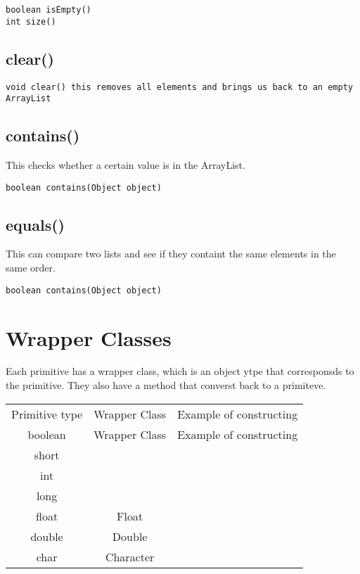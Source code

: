 \documentclass[a4paper]{report}   %
\begin{document}
\begin{lstlisting}
boolean isEmpty()
int size()
\end{lstlisting}

\subsection{clear()}

\begin{lstlisting}
void clear() this removes all elements and brings us back to an empty ArrayList
\end{lstlisting}

\subsection{contains()}

This checks whether a certain value is in the ArrayList.

\begin{lstlisting}
boolean contains(Object object)
\end{lstlisting}

\subsection{equals()}

This can compare two lists and see if they containt the same elements in the same order.

\begin{lstlisting}
boolean contains(Object object)
\end{lstlisting}

\section{Wrapper Classes}

Each primitive has a wrapper class, which is an object ytpe that corresponsds to the primitive. They also have a method that converst back to a primiteve.\\


\begin{center}
\begin{tabular}{| c | c | c |}
Primitive type & Wrapper Class & Example of constructing\\
boolean & Wrapper Class & Example of constructing\\
short\\
int\\
long\\
float & Float\\
double & Double\\
char & Character\\
\end{tabular}
\end{center}
\end{document}
